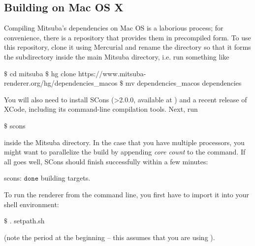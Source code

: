 \subsection{Building on Mac OS X}
\vspace{-5mm}
Compiling Mitsuba's dependencies on Mac OS is a laborious process; for convenience, there
is a repository that provides them in precompiled form. To use this repository, clone it
using Mercurial and rename the directory so that it forms the  subdirectory
inside the main Mitsuba directory, i.e. run something like 
\begin{shell}
$\text{\$}$ cd mitsuba
$\text{\$}$ hg clone https://www.mitsuba-renderer.org/hg/dependencies_macos
$\text{\$}$ mv dependencies_macos dependencies
\end{shell}
You will also need to install SCons (>2.0.0, available at ) and 
a recent release of XCode, including its command-line compilation tools. Next, run
\begin{shell}
$\text{\$}$ scons
\end{shell}
inside the Mitsuba directory. In the case that you have multiple processors, you might want to parallelize the build by appending \emph{core count} to the command.
If all goes well, SCons should finish successfully within a few minutes:
\begin{shell}
scons: $\texttt{done}$ building targets.
\end{shell}
To run the renderer from the command line, you first have to import it into your shell environment:
\begin{shell}
$\text{\$}$ . setpath.sh
\end{shell}
(note the period at the beginning -- this assumes that you are using ).

